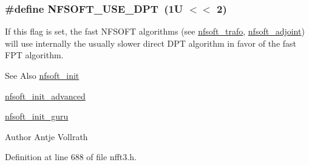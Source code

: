 \hypertarget{group__nfsoft_ga619b249b5d4b4675d2ce9a17d7817590}{
\subsubsection[{N\-F\-S\-O\-F\-T\-\_\-\-U\-S\-E\-\_\-\-D\-P\-T}]{\setlength{\rightskip}{0pt plus 5cm}\#define N\-F\-S\-O\-F\-T\-\_\-\-U\-S\-E\-\_\-\-D\-P\-T~(1\-U $<$$<$ 2)}}\label{group__nfsoft_ga619b249b5d4b4675d2ce9a17d7817590}
If this flag is set, the fast N\-F\-S\-O\-F\-T algorithms (see \hyperlink{group__nfsoft_gae243cd75d7571a99eae53818e32355fb}{nfsoft\-\_\-trafo}, \hyperlink{group__nfsoft_ga08395b1dd90f9a2565685d17460afc5b}{nfsoft\-\_\-adjoint}) will use internally the usually slower direct D\-P\-T algorithm in favor of the fast F\-P\-T algorithm.

\begin{DoxySeeAlso}{See Also}
\hyperlink{group__nfsoft_ga31c884458165fa204073c6c16c10775e}{nfsoft\-\_\-init} 

\hyperlink{group__nfsoft_gaf4aec4ee2a2a5d56ca27c4f1a7f90b18}{nfsoft\-\_\-init\-\_\-advanced} 

\hyperlink{group__nfsoft_ga1c13cdd3f82f48fa41acdd313cdc2052}{nfsoft\-\_\-init\-\_\-guru} 
\end{DoxySeeAlso}
\begin{DoxyAuthor}{Author}
Antje Vollrath 
\end{DoxyAuthor}


Definition at line 688 of file nfft3.\-h.


